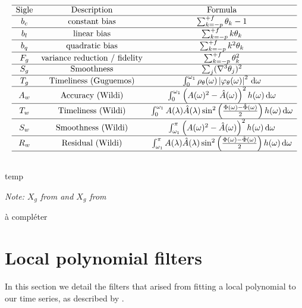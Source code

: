 \documentclass[
  12pt,
  ,
  a4paper]{article}
\newcommand\1{\mathds{1}}
\newcommand\ud{\,\mathrm{d}}
\begin{document}
\begin{table}[!ht]
$$
\begin{array}{ccc}
\hline \text{Sigle} & \text{Description} & \text{Formula}\\
\hline b_{c} & \text{constant bias} & \sum_{k=-p}^{+f}\theta_{k}-1\\
\hline b_{l} & \text{linear bias} & \sum_{k=-p}^{+f}k\theta_{k}\\
\hline b_{q} & \text{quadratic bias} & \sum_{k=-p}^{+f}k^{2}\theta_{k}\\
\hline F_{g} & \text{variance reduction / fidelity} & \sum_{k=-p}^{+f}\theta_{k}^{2}\\
\hline S_{g} & \text{Smoothness} & \sum_{j}(\nabla^{3}\theta_{j})^{2}\\
\hline T_{g} & \text{Timeliness (Guguemos)} & \int_{0}^{\omega_{1}}\rho_{\theta}(\omega)\left|\varphi_{\theta}(\omega)\right|^{2}\ud\omega\\
\hline A_{w} & \text{Accuracy (Wildi)} & \int_0^{\omega_1}\left(A(\omega)^{2}-\hat{A}(\omega)\right)^{2}h(\omega)\ud\omega\\
\hline T_{w} & \text{Timeliness (Wildi)} & \int_0^{\omega_1} A(\lambda)\hat{A}(\lambda)\sin^{2}\left(\frac{\Phi(\omega)-\hat{\Phi}(\omega)}{2}\right)h(\omega)\ud\omega\\
\hline S_{w} & \text{Smoothness (Wildi)} & \int_{\omega_1}^{\pi}\left(A(\omega)^{2}-\hat{A}(\omega)\right)^{2}h(\omega)\ud\omega\\
\hline R_{w} & \text{Residual (Wildi)} & \int_{\omega_1}^{\pi} A(\lambda)\hat{A}(\lambda)\sin^{2}\left(\frac{\Phi(\omega)-\hat{\Phi}(\omega)}{2}\right)h(\omega)\ud\omega\\
\hline \\
\end{array}
$$
\caption{temp}
\footnotesize
\emph{Note: $X_g$ from \textcite{ch15HBSA} and $X_g$ from \textcite{trilemmaWMR2019}}
\end{table}

\colorbox{BurntOrange}{à compléter}

\hypertarget{local-polynomial-filters}{%
\section{Local polynomial filters}\label{local-polynomial-filters}}

In this section we detail the filters that arised from fitting a local polynomial to our time series, as described by \textcite{proietti2008}.
\end{document}
